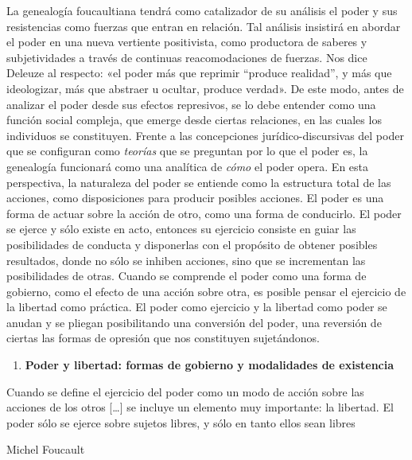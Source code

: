 La genealogía foucaultiana tendrá como catalizador de su análisis el poder y sus resistencias como fuerzas que entran en relación. Tal análisis insistirá en abordar el poder en una nueva vertiente positivista, como productora de saberes y subjetividades a través de continuas reacomodaciones de fuerzas. Nos dice Deleuze al respecto: «el poder más que reprimir ``produce realidad'', y más que ideologizar, más que abstraer u ocultar, produce verdad». De este modo, antes de analizar el poder desde sus efectos represivos, se lo debe entender como una función social compleja, que emerge desde ciertas relaciones, en las cuales los individuos se constituyen. Frente a las concepciones jurídico-discursivas del poder que se configuran como \emph{teorías} que se preguntan por lo que el poder es, la genealogía funcionará como una analítica de \emph{cómo }el poder opera. En esta perspectiva, la naturaleza del poder se entiende como la estructura total de las acciones, como disposiciones para producir posibles acciones. El poder es una forma de actuar sobre la acción de otro, como una forma de conducirlo. El poder se ejerce y sólo existe en acto, entonces su ejercicio consiste en guiar las posibilidades de conducta y disponerlas con el propósito de obtener posibles resultados, donde no sólo se inhiben acciones, sino que se incrementan las posibilidades de otras. Cuando se comprende el poder como una forma de gobierno, como el efecto de una acción sobre otra, es posible pensar el ejercicio de la libertad como práctica. El poder como ejercicio y la libertad como poder se anudan y se pliegan posibilitando una conversión del poder, una reversión de ciertas las formas de opresión que nos constituyen sujetándonos.

\begin{enumerate}
\def\labelenumi{\arabic{enumi}.}
\item
  \textbf{Poder y libertad: formas de gobierno y modalidades de existencia}
\end{enumerate}

Cuando se define el ejercicio del poder como un modo de acción sobre las acciones de los otros {[}\ldots{]} se incluye un elemento muy importante: la libertad. El poder sólo se ejerce sobre sujetos libres, y sólo en tanto ellos sean libres

Michel Foucault

